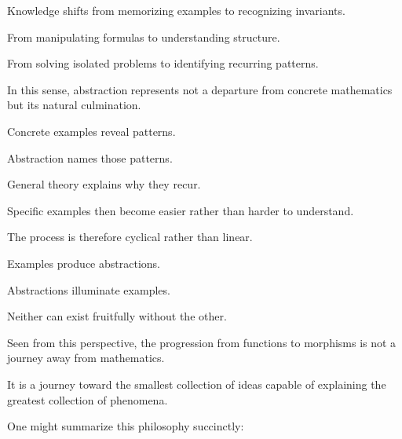 \documentclass[11pt]{book}
\numberwithin{equation}{chapter}
\theoremstyle{definition}
\theoremstyle{plain}
\theoremstyle{remark}
\begin{document}
Knowledge shifts from memorizing examples to recognizing invariants.

From manipulating formulas to understanding structure.

From solving isolated problems to identifying recurring patterns.

In this sense, abstraction represents not a departure from concrete mathematics but its natural culmination.

Concrete examples reveal patterns.

Abstraction names those patterns.

General theory explains why they recur.

Specific examples then become easier rather than harder to understand.

The process is therefore cyclical rather than linear.

Examples produce abstractions.

Abstractions illuminate examples.

Neither can exist fruitfully without the other.

Seen from this perspective, the progression from functions to morphisms is not a journey away from mathematics.

It is a journey toward the smallest collection of ideas capable of explaining the greatest collection of phenomena.

One might summarize this philosophy succinctly:
\end{document}
